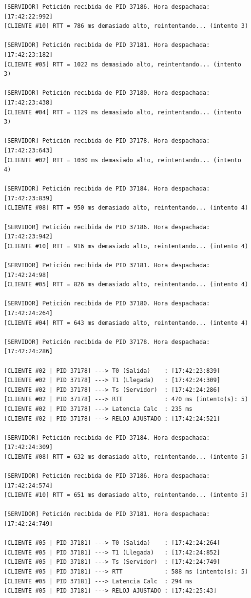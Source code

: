 \begin{lstlisting}[style=estiloC]
[SERVIDOR] Petición recibida de PID 37186. Hora despachada: [17:42:22:992]
[CLIENTE #10] RTT = 786 ms demasiado alto, reintentando... (intento 3)

[SERVIDOR] Petición recibida de PID 37181. Hora despachada: [17:42:23:182]
[CLIENTE #05] RTT = 1022 ms demasiado alto, reintentando... (intento 3)

[SERVIDOR] Petición recibida de PID 37180. Hora despachada: [17:42:23:438]
[CLIENTE #04] RTT = 1129 ms demasiado alto, reintentando... (intento 3)

[SERVIDOR] Petición recibida de PID 37178. Hora despachada: [17:42:23:643]
[CLIENTE #02] RTT = 1030 ms demasiado alto, reintentando... (intento 4)

[SERVIDOR] Petición recibida de PID 37184. Hora despachada: [17:42:23:839]
[CLIENTE #08] RTT = 950 ms demasiado alto, reintentando... (intento 4)

[SERVIDOR] Petición recibida de PID 37186. Hora despachada: [17:42:23:942]
[CLIENTE #10] RTT = 916 ms demasiado alto, reintentando... (intento 4)

[SERVIDOR] Petición recibida de PID 37181. Hora despachada: [17:42:24:98]
[CLIENTE #05] RTT = 826 ms demasiado alto, reintentando... (intento 4)

[SERVIDOR] Petición recibida de PID 37180. Hora despachada: [17:42:24:264]
[CLIENTE #04] RTT = 643 ms demasiado alto, reintentando... (intento 4)

[SERVIDOR] Petición recibida de PID 37178. Hora despachada: [17:42:24:286]

[CLIENTE #02 | PID 37178] ---> T0 (Salida)    : [17:42:23:839]
[CLIENTE #02 | PID 37178] ---> T1 (Llegada)   : [17:42:24:309]
[CLIENTE #02 | PID 37178] ---> Ts (Servidor)  : [17:42:24:286]
[CLIENTE #02 | PID 37178] ---> RTT            : 470 ms (intento(s): 5)
[CLIENTE #02 | PID 37178] ---> Latencia Calc  : 235 ms
[CLIENTE #02 | PID 37178] ---> RELOJ AJUSTADO : [17:42:24:521]

[SERVIDOR] Petición recibida de PID 37184. Hora despachada: [17:42:24:309]
[CLIENTE #08] RTT = 632 ms demasiado alto, reintentando... (intento 5)

[SERVIDOR] Petición recibida de PID 37186. Hora despachada: [17:42:24:574]
[CLIENTE #10] RTT = 651 ms demasiado alto, reintentando... (intento 5)

[SERVIDOR] Petición recibida de PID 37181. Hora despachada: [17:42:24:749]

[CLIENTE #05 | PID 37181] ---> T0 (Salida)    : [17:42:24:264]
[CLIENTE #05 | PID 37181] ---> T1 (Llegada)   : [17:42:24:852]
[CLIENTE #05 | PID 37181] ---> Ts (Servidor)  : [17:42:24:749]
[CLIENTE #05 | PID 37181] ---> RTT            : 588 ms (intento(s): 5)
[CLIENTE #05 | PID 37181] ---> Latencia Calc  : 294 ms
[CLIENTE #05 | PID 37181] ---> RELOJ AJUSTADO : [17:42:25:43]


\end{lstlisting}
